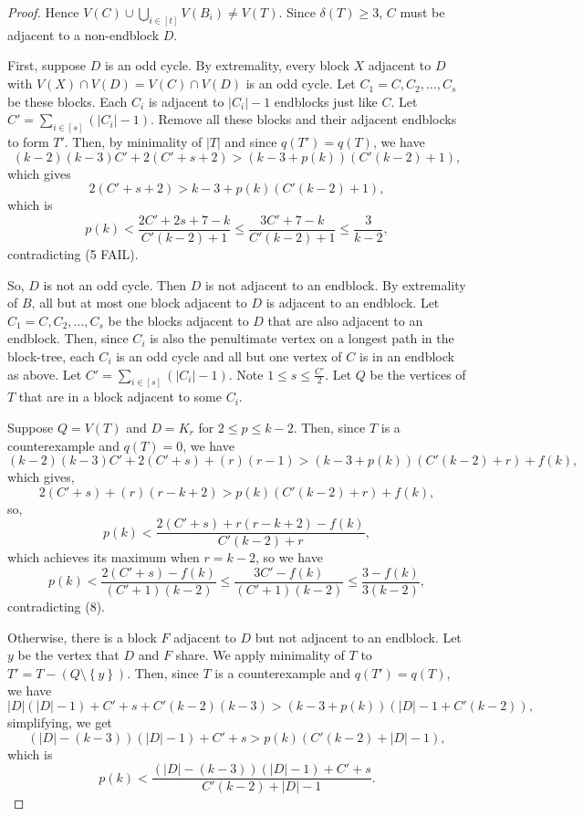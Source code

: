 \documentclass[12pt]{article}
\theoremstyle{plain}
\theoremstyle{definition}
\theoremstyle{remark}
\newcommand{\set}[1]{\left\{ #1 \right\}}
\newcommand{\card}[1]{\left|#1\right|}
\newcommand{\irange}[1]{\left[#1\right]}
\newcommand{\parens}[1]{\left( #1 \right)}
\begin{document}
\begin{proof}
		 Hence $V(C) \cup \bigcup_{i \in \irange{t}} V(B_i) \ne V(T)$.  Since $\delta(T) \ge 3$, $C$ must be adjacent to a non-endblock $D$.
		 
		 First, suppose $D$ is an odd cycle.  By extremality, every block $X$ adjacent to $D$ with $V(X) \cap V(D) = V(C) \cap V(D)$ is an odd cycle. Let $C_1 = C, C_2, \ldots, C_s$ be these blocks.  Each $C_i$ is adjacent to $|C_i| - 1$ endblocks just like $C$.   Let $C' = \sum_{i \in \irange{s}} \parens{\card{C_i} - 1}$. Remove all these blocks and their adjacent endblocks to form $T'$.  Then, by minimality of $\card{T}$ and since $q(T') = q(T)$, we have
		 \[(k-2)(k-3)C' + 2(C' + s + 2) > (k-3 + p(k))(C'(k-2) + 1),\]
		 which gives
		 \[2(C' + s + 2) > k-3 + p(k)(C'(k-2) + 1),\]
		 which is
		 \[p(k) < \frac{2C' + 2s + 7 - k}{C'(k-2) + 1} \le \frac{3C' + 7 - k}{C'(k-2) + 1} \le \frac{3}{k-2},\]
		 contradicting (5 FAIL).		 
		 
		 So, $D$ is not an odd cycle.  Then $D$ is not adjacent to an endblock.  By extremality of $B$, all but at most one block adjacent to $D$ is adjacent to an endblock.  Let $C_1 = C, C_2, \ldots, C_s$ be the blocks adjacent to $D$ that are also adjacent to an endblock.  Then, since $C_i$ is also the penultimate vertex on a longest path in the block-tree, each $C_i$ is an odd cycle and all but one vertex of $C$ is in an endblock as above.  Let $C' = \sum_{i \in \irange{s}} \parens{\card{C_i} - 1}$. Note $1 \le s \le \frac{C'}{2}$.  Let $Q$ be the vertices of $T$ that are in a block adjacent to some $C_i$.
		 
		 Suppose $Q = V(T)$ and $D = K_r$ for $2 \le p \le k-2$. Then, since $T$ is a counterexample and $q(T) = 0$, we have
		 \[(k-2)(k-3)C' + 2(C' + s) + (r)(r-1) > (k-3 + p(k))(C'(k-2) + r) + f(k),\]
		 which gives,
		 \[2(C' + s) + (r)(r - k + 2) > p(k)(C'(k-2) + r) + f(k),\]
		 so,
		 \[p(k) < \frac{2(C' + s) + r(r - k + 2) - f(k)}{C'(k-2) + r},\]
		 which achieves its maximum when $r = k-2$, so we have
		\[p(k) < \frac{2(C' + s) - f(k)}{(C'+1)(k-2)} \le \frac{3C' - f(k)}{(C'+1)(k-2)} \le \frac{3-f(k)}{3(k-2)},\]
		contradicting (8).
		 
		 Otherwise, there is a block $F$ adjacent to $D$ but not adjacent to an endblock.  Let $y$ be the vertex that $D$ and $F$ share.  We apply minimality of $T$ to $T'= T - (Q \setminus \set{y})$.   Then, since $T$ is a counterexample and $q(T') = q(T)$, we have
		 \[\card{D}(\card{D}-1) + C' + s + C'(k-2)(k-3) > (k-3 + p(k))(\card{D} - 1 + C'(k-2)),\]
		 simplifying, we get
		 \[(\card{D} - (k-3))(\card{D}-1) + C' + s > p(k)(C'(k-2) + \card{D} - 1),\]
		 which is
		 \[p(k) < \frac{(\card{D} - (k-3))(\card{D}-1) + C' + s}{C'(k-2) + \card{D} - 1}.\]
		 

\end{proof}
\end{document}
